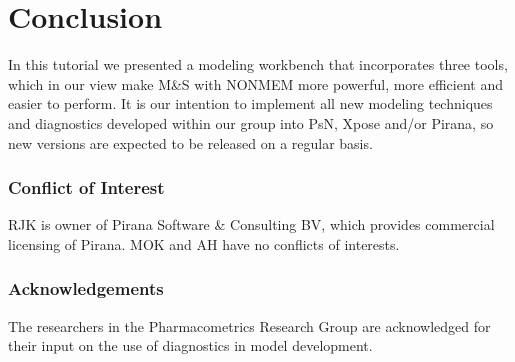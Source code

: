 \section{Conclusion} In this tutorial we presented a modeling
workbench that incorporates three tools, which in our view make M\&S
with NONMEM more powerful, more efficient and easier to perform. It is
our intention to implement all new modeling techniques and diagnostics
developed within our group into PsN, Xpose and/or Pirana, so new
versions are expected to be released on a regular basis.


\subsubsection{Conflict of Interest}RJK is owner of Pirana Software \& Consulting
BV, which provides commercial licensing of Pirana. MOK and
AH have no conflicts of interests.

\subsubsection{Acknowledgements}
The researchers in the Pharmacometrics Research Group are acknowledged
for their input on the use of diagnostics in model
development.


